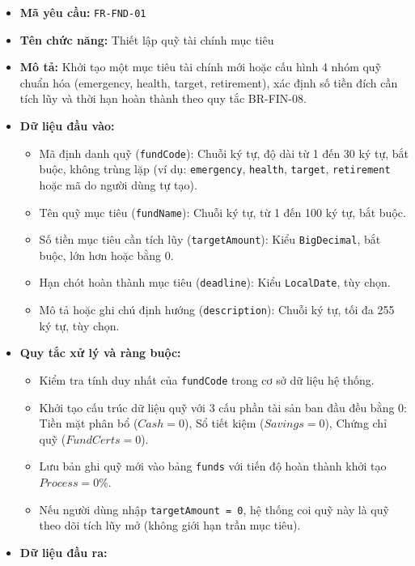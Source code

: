 \documentclass[11pt,a4paper]{article}
\providecommand{\tightlist}{
  \setlength{\itemsep}{0pt}\setlength{\parskip}{0pt}}
\begin{document}
\begin{itemize}
\tightlist
\item
  \textbf{Mã yêu cầu:} \texttt{FR-FND-01}
\item
  \textbf{Tên chức năng:} Thiết lập quỹ tài chính mục tiêu
\item
  \textbf{Mô tả:} Khởi tạo một mục tiêu tài chính mới hoặc cấu hình 4
  nhóm quỹ chuẩn hóa (emergency, health, target, retirement), xác định
  số tiền đích cần tích lũy và thời hạn hoàn thành theo quy tắc
  BR-FIN-08.
\item
  \textbf{Dữ liệu đầu vào:}

  \begin{itemize}
  \tightlist
  \item
    Mã định danh quỹ (\texttt{fundCode}): Chuỗi ký tự, độ dài từ 1 đến
    30 ký tự, bắt buộc, không trùng lặp (ví dụ: \texttt{emergency},
    \texttt{health}, \texttt{target}, \texttt{retirement} hoặc mã do
    người dùng tự tạo).
  \item
    Tên quỹ mục tiêu (\texttt{fundName}): Chuỗi ký tự, từ 1 đến 100 ký
    tự, bắt buộc.
  \item
    Số tiền mục tiêu cần tích lũy (\texttt{targetAmount}): Kiểu
    \texttt{BigDecimal}, bắt buộc, lớn hơn hoặc bằng 0.
  \item
    Hạn chót hoàn thành mục tiêu (\texttt{deadline}): Kiểu
    \texttt{LocalDate}, tùy chọn.
  \item
    Mô tả hoặc ghi chú định hướng (\texttt{description}): Chuỗi ký tự,
    tối đa 255 ký tự, tùy chọn.
  \end{itemize}
\item
  \textbf{Quy tắc xử lý và ràng buộc:}

  \begin{itemize}
  \tightlist
  \item
    Kiểm tra tính duy nhất của \texttt{fundCode} trong cơ sở dữ liệu hệ
    thống.
  \item
    Khởi tạo cấu trúc dữ liệu quỹ với 3 cấu phần tài sản ban đầu đều
    bằng 0: Tiền mặt phân bổ (\(Cash = 0\)), Sổ tiết kiệm
    (\(Savings = 0\)), Chứng chỉ quỹ (\(FundCerts = 0\)).
  \item
    Lưu bản ghi quỹ mới vào bảng \texttt{funds} với tiến độ hoàn thành
    khởi tạo \(Process = 0\%\).
  \item
    Nếu người dùng nhập \texttt{targetAmount\ =\ 0}, hệ thống coi quỹ
    này là quỹ theo dõi tích lũy mở (không giới hạn trần mục tiêu).
  \end{itemize}
\item
  \textbf{Dữ liệu đầu ra:}


\end{itemize}
\end{document}
